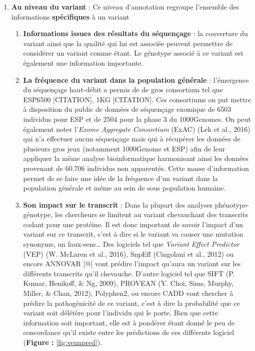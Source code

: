 \documentclass[12pt,twoside]{reedthesis}
\providecommand{\tightlist}{%
  \setlength{\itemsep}{0pt}\setlength{\parskip}{0pt}}
\theoremstyle{definition}
\theoremstyle{definition}
\theoremstyle{remark}
\begin{document}
  \begin{enumerate}
  \def\labelenumi{\arabic{enumi}.}
  \tightlist
  \item
    \textbf{Au niveau du variant} : Ce niveau d'annotation regroupe
    l'ensemble des informations \textbf{spécifiques} à un variant
  
    \begin{enumerate}
    \def\labelenumii{\alph{enumii}.}
    \tightlist
    \item
      \textbf{Informations issues des résultats du séquençage} : la
      couverture du variant ainsi que la qualité qui lui est associée
      peuvent permettre de considérer un variant comme étant. Le génotype
      associé à ce variant est également une information importante.\\
    \item
      \textbf{La fréquence du variant dans la population générale} :
      l'émergence du séquençage haut-débit a permis de de gros consortium
      tel que ESP6500 {[}CITATION{]}, 1KG {[}CITATION{]}. Ces consortiums
      on put mettre à disposition du public de données de séquençage
      exomique de 6503 individus pour ESP et de 2504 pour la phase 3 du
      1000Genomes. On peut également noter l'\emph{Exome Aggregate
      Consortium} (ExAC) (Lek et al., 2016) qui n'a effectuer aucun
      séquençage mais qui à récupérer les données de plusieurs gros jeux
      (notamment 1000Genome et ESP) afin de leur appliquer la même analyse
      bioinformatique harmonisant ainsi les données provenant de 60.706
      individus non apparentés. Cette masse d'information permet de se
      faire une idée de la fréquence d'un variant dans la population
      générale et même au sein de sous population humaine.\\
    \item
      \textbf{Son impact sur le transcrit} : Dans la plupart des analyses
      phénotype-génotype, les chercheurs se limitent au variant
      chevauchant des transcrits codant pour une protéine. Il est donc
      important de savoir l'impact d'un variant sur ce transcrit, c'est à
      dire si le variant va causer une mutation synonyme, un
      faux-sens\ldots{} Des logiciels tel que \emph{Variant Effect
      Predictor} (VEP) (W. McLaren et al., 2016), SnpEff (Cingolani et
      al., 2012) ou encore ANNOVAR {[}@{]} vont prédire l'impact qu'aura
      un variant sur les différents transcrits qu'il chevauche. D'autre
      logiciel tel que SIFT (P. Kumar, Henikoff, \& Ng, 2009), PROVEAN (Y.
      Choi, Sims, Murphy, Miller, \& Chan, 2012), Polyphen2, ou encore
      CADD vont chercher à prédire la pathogénicité de ce variant, c'est à
      dire la probabilité que ce variant soit délétère pour l'individu qui
      le porte. Bien que cette information soit important, elle est à
      pondérer étant donné le peu de concordance qu'il existe entre les
      prédictions de ces différents logiciel (\textbf{Figure :}
      \ref{fig:vennpred}).
    \end{enumerate}
  \end{enumerate}
  
\end{document}
